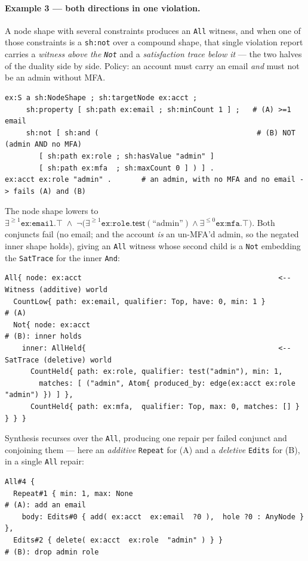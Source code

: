 \documentclass[11pt]{article}
\newcommand{\test}{\mathsf{test}}
\newcommand{\code}[1]{\texttt{#1}}
\theoremstyle{definition}
\begin{document}
\paragraph{Example 3 --- both directions in one violation.} A node shape with
several constraints produces an \code{All} witness, and when one of those
constraints is a \code{sh:not} over a compound shape, that single violation report
carries a \emph{witness above the \code{Not}} and a \emph{satisfaction trace below
it} --- the two halves of the duality side by side. Policy: an account must carry
an email \emph{and} must not be an admin without MFA.
\begin{lstlisting}[language={}]
ex:S a sh:NodeShape ; sh:targetNode ex:acct ;
     sh:property [ sh:path ex:email ; sh:minCount 1 ] ;   # (A) >=1 email
     sh:not [ sh:and (                                     # (B) NOT (admin AND no MFA)
        [ sh:path ex:role ; sh:hasValue "admin" ]
        [ sh:path ex:mfa  ; sh:maxCount 0 ] ) ] .
ex:acct ex:role "admin" .       # an admin, with no MFA and no email -> fails (A) and (B)
\end{lstlisting}
The node shape lowers to
$\exists^{\geq1}\code{ex:email}.\top \;\wedge\;
\neg\big(\exists^{\geq1}\code{ex:role}.\test(\text{``admin''}) \wedge
\exists^{\leq0}\code{ex:mfa}.\top\big)$. Both conjuncts fail (no email; and the
account \emph{is} an un-MFA'd admin, so the negated inner shape holds), giving an
\code{All} witness whose second child is a \code{Not} embedding the \code{SatTrace}
for the inner \code{And}:
\begin{lstlisting}[language={}]
All{ node: ex:acct                                              <-- Witness (additive) world
  CountLow{ path: ex:email, qualifier: Top, have: 0, min: 1 }              # (A)
  Not{ node: ex:acct                                                       # (B): inner holds
    inner: AllHeld{                                             <-- SatTrace (deletive) world
      CountHeld{ path: ex:role, qualifier: test("admin"), min: 1,
        matches: [ ("admin", Atom{ produced_by: edge(ex:acct ex:role "admin") }) ] },
      CountHeld{ path: ex:mfa,  qualifier: Top, max: 0, matches: [] } } } }
\end{lstlisting}
Synthesis recurses over the \code{All}, producing one repair per failed conjunct
and conjoining them --- here an \emph{additive} \code{Repeat} for (A) and a
\emph{deletive} \code{Edits} for (B), in a single \code{All} repair:
\begin{lstlisting}[language={}]
All#4 {
  Repeat#1 { min: 1, max: None                                             # (A): add an email
    body: Edits#0 { add( ex:acct  ex:email  ?0 ),  hole ?0 : AnyNode } },
  Edits#2 { delete( ex:acct  ex:role  "admin" ) } }                        # (B): drop admin role
\end{lstlisting}
\end{document}
